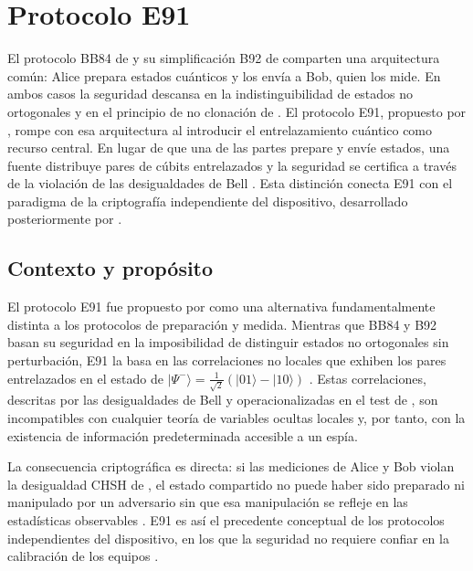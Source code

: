 \section{Protocolo E91}

El protocolo BB84 de \cite{bennett1984} y su simplificación B92 de \cite{bennett1992} comparten una arquitectura común: Alice prepara estados cuánticos y los envía a Bob, quien los mide. En ambos casos la seguridad descansa en la indistinguibilidad de estados no ortogonales y en el principio de no clonación de \cite{wootters1982}. El protocolo E91, propuesto por \cite{ekert1991}, rompe con esa arquitectura al introducir el entrelazamiento cuántico como recurso central. En lugar de que una de las partes prepare y envíe estados, una fuente distribuye pares de cúbits entrelazados y la seguridad se certifica a través de la violación de las desigualdades de Bell \citep{bell1964,clauser1969}. Esta distinción conecta E91 con el paradigma de la criptografía independiente del dispositivo, desarrollado posteriormente por \cite{acin2007}.

\subsection{Contexto y propósito}

El protocolo E91 fue propuesto por \cite{ekert1991} como una alternativa fundamentalmente distinta a los protocolos de preparación y medida. Mientras que BB84 \citep{bennett1984} y B92 \citep{bennett1992} basan su seguridad en la imposibilidad de distinguir estados no ortogonales sin perturbación, E91 la basa en las correlaciones no locales que exhiben los pares entrelazados en el estado de \cite{bell1964} $|\Psi^-\rangle = \frac{1}{\sqrt{2}}(|01\rangle - |10\rangle)$ \citep{ekert1991,gisin2002}. Estas correlaciones, descritas por las desigualdades de Bell y operacionalizadas en el test de \cite{clauser1969}, son incompatibles con cualquier teoría de variables ocultas locales y, por tanto, con la existencia de información predeterminada accesible a un espía.

La consecuencia criptográfica es directa: si las mediciones de Alice y Bob violan la desigualdad CHSH de \cite{clauser1969}, el estado compartido no puede haber sido preparado ni manipulado por un adversario sin que esa manipulación se refleje en las estadísticas observables \citep{ekert1991,acin2007}. E91 es así el precedente conceptual de los protocolos independientes del dispositivo, en los que la seguridad no requiere confiar en la calibración de los equipos \citep{acin2007,scarani2009}.

